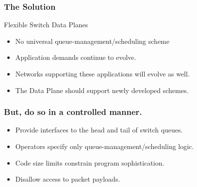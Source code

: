 \begin{frame}[plain]
\frametitle{The Solution}
Flexible Switch Data Planes
\begin{itemize}
\item No universal queue-management/scheduling scheme
\item Application demands continue to evolve.
\item Networks supporting these applications will evolve as well.
\item The Data Plane should support newly developed schemes.
\end{itemize}
\end{frame}

\begin{frame}[plain]
\frametitle{But, do so in a controlled manner.}
\begin{itemize}
\item Provide interfaces to the head and tail of switch queues.
\item Operators specify only queue-management/scheduling logic.
\item Code size limits constrain program sophistication.
\item Disallow access to packet payloads.
\end{itemize}
\end{frame}

